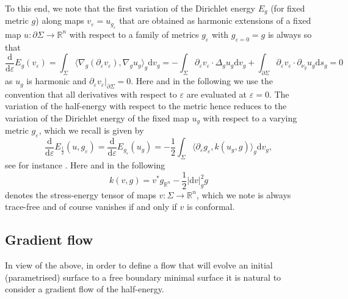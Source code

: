 \documentclass[10pt,reqno]{amsart}
\theoremstyle{plain}
\theoremstyle{definition}
\numberwithin{equation}{section}
\newcommand{\Si}{\Sigma}
\newcommand{\peps}{\partial_{\eps}}
\newcommand{\R}{\ensuremath{{\mathbb R}}}
\newcommand{\beq}{\begin{equation}}
\newcommand{\eeq}{\end{equation}}
\newcommand{\half}{\frac{1}{2}}
\newcommand{\dd}{\mathrm{d}} %
\newcommand{\abs}[1]{\vert#1\vert}
\newcommand{\eps}{\varepsilon}
\newcommand{\na}{\nabla}
\newcommand{\pSi}{{\partial \Sigma}}
\newcommand{\png}{{\partial_{\nu_g}}}
\newcommand{\p}{\partial} %
\newcommand{\inner}[2]{\langle #1, #2\rangle} %
\begin{document}
To this end, we note that the first variation of the Dirichlet energy $E_g$ (for fixed metric $g$) along maps $v_\eps=u_{g_\eps}$ that are obtained as harmonic extensions of a fixed map $u:\pSi\to \R^n$ with respect to a family of metrics $g_\eps$ with $g_{\eps=0}=g$ is always so that 
\begin{equation*}
    \frac{\dd}{\dd\eps} E_{g}(v_{\eps})=\int_\Si \inner{\na_g(\peps v_\eps)}{\na_g u_g}_g \dd v_g =-\int_{\Si} \peps v_{\eps}\cdot \Delta_g u_g \dd v_g+\int_{\p\Si}\peps v_\eps \cdot \png u_g \dd s_g=0
\end{equation*}
as $u_g$ is harmonic and $\peps v_\eps\vert_{\partial \Si}=0$. Here and in the following we use the convention that all derivatives with respect to $\eps$ are evaluated at $\eps=0$. The variation of the half-energy with respect to the metric hence reduces to the variation of the Dirichlet energy of the fixed map $u_g$ with respect to a varying metric $g_\eps$, which we recall is given by 
\beq\label{eq:energy_var_metric}
    \frac{\dd}{\dd\eps} E_{\half}(u,g_\eps) =\frac{\dd}{\dd\eps} E_{g_\eps}(u_g) =-\half\int_{\Si}\langle \peps g_\eps,k(u_g,g)\rangle_g \dd v_g,
\eeq
see for instance \cite[Lemma 3.4.1]{Baird_Wood_Textbook}. Here and in the following 
\beq\label{def:stress}
    k(v,g)=v^*g_{\R^n}-\half \abs{\dd v}_g^2 g
\eeq 
denotes the stress-energy tensor of maps $v:\Si\to \R^n$, which we note is always trace-free and of course vanishes if and only if $v$ is conformal.


\subsection{Gradient flow}
In view of the above, in order to define a flow that will evolve an initial (parametrised) surface to a free boundary minimal surface it is natural to consider a gradient flow of the half-energy. 
\end{document}
